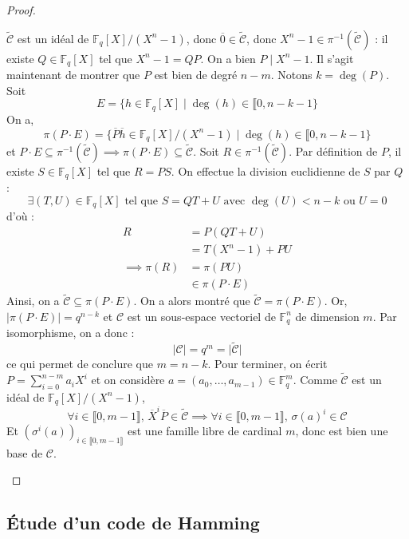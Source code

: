 \begin{proof}
\begin{enumerate}[label=(\roman*)]
			\newpar
			$\widetilde{\mathcal{C}}$ est un idéal de $\mathbb{F}_q[X]/(X^n-1)$, donc $\overline{0} \in \widetilde{\mathcal{C}}$, donc $X^n - 1 \in \pi^{-1}(\widetilde{\mathcal{C}})$ : il existe $Q \in \mathbb{F}_q[X]$ tel que $X^n - 1 = QP$. On a bien $P \mid X^n - 1$.
			\newpar
			Il s'agit maintenant de montrer que $P$ est bien de degré $n-m$. Notons $k = \deg(P)$. Soit
			\[ E = \{ h \in \mathbb{F}_q[X] \mid \deg(h) \in \llbracket 0, n-k-1 \} \]
			On a,
			\[ \pi(P \cdot E) = \{ \overline{P}\overline{h} \in \mathbb{F}_q[X]/(X^n-1) \mid \deg(h) \in \llbracket 0, n-k-1 \} \]
			et $P \cdot E \subseteq \pi^{-1}(\widetilde{\mathcal{C}}) \implies \pi(P\cdot E) \subseteq \widetilde{\mathcal{C}}$.
			\newpar
			Soit $R \in \pi^{-1}(\widetilde{\mathcal{C}})$. Par définition de $P$, il existe $S \in \mathbb{F}_q[X]$ tel que $R = PS$. On effectue la division euclidienne de $S$ par $Q$ :
			\[ \exists (T,U) \in \mathbb{F}_q[X] \text{ tel que } S = QT + U \text{ avec } \deg(U) < n-k \text{ ou } U = 0 \]
			d'où :
			\begin{align*}
				R &= P(QT + U) \\
				&= T(X^n - 1) + PU \\
				\implies \pi(R) &= \pi(PU) \\
				&\in \pi(P \cdot E)
			\end{align*}
			Ainsi, on a $\widetilde{\mathcal{C}} \subseteq \pi(P \cdot E)$. On a alors montré que $\widetilde{\mathcal{C}} = \pi(P \cdot E)$. Or, $\vert \pi(P \cdot E) \vert = q^{n-k}$ et $\mathcal{C}$ est un sous-espace vectoriel de $\mathbb{F}_q^n$ de dimension $m$. Par isomorphisme, on a donc :
			\[ \vert \mathcal{C} \vert = q^m = \vert \widetilde{\mathcal{C}} \vert \]
			ce qui permet de conclure que $m = n-k$.
			\newpar
			Pour terminer, on écrit $P = \sum_{i=0}^{n-m} a_i X^i$ et on considère $a = (a_0, \dots, a_{m-1}) \in \mathbb{F}_q^m$. Comme $\widetilde{\mathcal{C}}$ est un idéal de $\mathbb{F}_q[X]/(X^n-1)$,
			\[ \forall i \in \llbracket 0, m-1 \rrbracket, \, \overline{X}^i \overline{P} \in \widetilde{\mathcal{C}} \implies \forall i \in \llbracket 0, m-1 \rrbracket, \, \sigma(a)^{i} \in \mathcal{C} \]
			Et $(\sigma^{i}(a))_{i \in \llbracket 0, m-1 \rrbracket}$ est une famille libre de cardinal $m$, donc est bien une base de $\mathcal{C}$.
		\end{enumerate}
	\end{proof}
	
	\subsection{Étude d'un code de Hamming}
	
